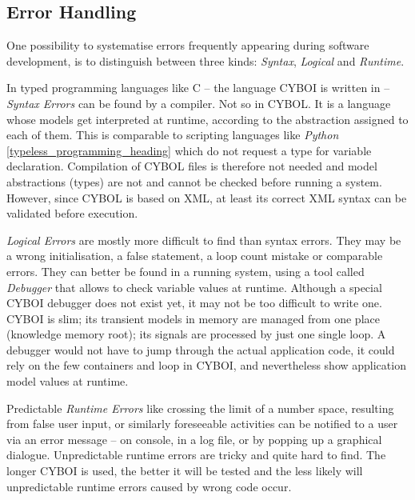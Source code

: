 %
%
%
%
%
%
%

\subsection{Error Handling}
\label{error_handling_heading}

One possibility to systematise errors frequently appearing during software
development, is to distinguish between three kinds: \emph{Syntax},
\emph{Logical} and \emph{Runtime}.

In typed programming languages like C -- the language CYBOI is written in --
\emph{Syntax Errors} can be found by a compiler. Not so in CYBOL. It is a
language whose models get interpreted at runtime, according to the abstraction
assigned to each of them. This is comparable to scripting languages like
\emph{Python} \ref{typeless_programming_heading} which do not request a type
for variable declaration. Compilation of CYBOL files is therefore not needed
and model abstractions (types) are not and cannot be checked before running a
system. However, since CYBOL is based on XML, at least its correct XML syntax
can be validated before execution.

\emph{Logical Errors} are mostly more difficult to find than syntax errors.
They may be a wrong initialisation, a false statement, a loop count mistake or
comparable errors. They can better be found in a running system, using a tool
called \emph{Debugger} that allows to check variable values at runtime. Although
a special CYBOI debugger does not exist yet, it may not be too difficult to
write one. CYBOI is slim; its transient models in memory are managed from one
place (knowledge memory root); its signals are processed by just one single
loop. A debugger would not have to jump through the actual application code,
it could rely on the few containers and loop in CYBOI, and nevertheless show
application model values at runtime.

Predictable \emph{Runtime Errors} like crossing the limit of a number space,
resulting from false user input, or similarly foreseeable activities can be
notified to a user via an error message -- on console, in a log file, or by
popping up a graphical dialogue. Unpredictable runtime errors are tricky and
quite hard to find. The longer CYBOI is used, the better it will be tested and
the less likely will unpredictable runtime errors caused by wrong code occur.
